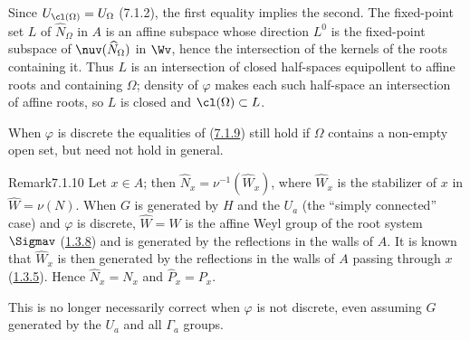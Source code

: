 \documentclass[12pt,a4paper,oneside,english]{smfart}
\makeatletter
\newcommand{\btanchor}[1]{\leavevmode\Hy@raisedlink{\hypertarget{bt:#1}{}}}
\newcommand{\btref}[1]{\hyperlink{bt:#1}{#1}}
\theoremstyle{definition}
\theoremstyle{bt}
\makeatother
\begin{document}
\begin{sketch}
Since $U_{\cl(\Omega)}=U_\Omega$ (7.1.2), the first equality implies the
second. The fixed-point set $L$ of $\widehat{N}_\Omega$ in $A$ is an
affine subspace whose direction $L^{0}$ is the fixed-point subspace of
$\nuv(\widehat{N}_\Omega)$ in $\Wv$, hence the intersection of the
kernels of the roots containing it. Thus $L$ is an intersection of
closed half-spaces equipollent to affine roots and containing $\Omega$;
density of $\varphi$ makes each such half-space an intersection of
affine roots, so $L$ is closed and $\cl(\Omega)\subset L$.
\end{sketch}

\noindent
When $\varphi$ is discrete the equalities of (\btref{7.1.9}) still hold if
$\Omega$ contains a non-empty open set, but need not hold in general.

\begin{bt}{Remark}{7.1.10}\btanchor{7.1.10}
Let $x\in A$; then $\widehat{N}_x=\nu^{-1}(\widehat{W}_x)$, where
$\widehat{W}_x$ is the stabilizer of $x$ in $\widehat{W}=\nu(N)$. When
$G$ is generated by $H$ and the $U_a$ (the ``simply connected'' case) and
$\varphi$ is discrete, $\widehat{W}=W$ is the affine Weyl group of the
root system $\Sigmav$ (\btref{1.3.8}) and is generated by the reflections in the
walls of $A$. It is known that $\widehat{W}_x$ is then generated by the
reflections in the walls of $A$ passing through $x$ (\btref{1.3.5}). Hence
$\widehat{N}_x=N_x$ and $\widehat{P}_x=P_x$.

This is no longer necessarily correct when $\varphi$ is not discrete,
even assuming $G$ generated by the $U_a$ and all $\Gamma_a$ groups.
\end{bt}
\end{document}
